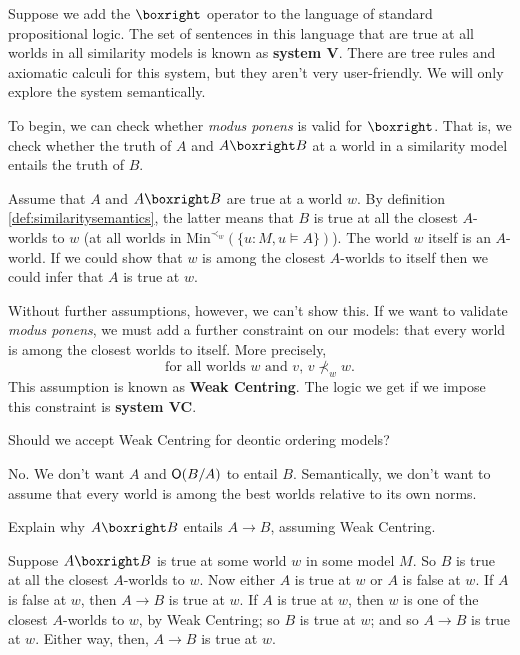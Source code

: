 Suppose we add the $\boxright$ operator to the language of standard
propositional logic. The set of sentences in this language that are true at all
worlds in all similarity models is known as \textbf{system V}. There are tree
rules and axiomatic calculi for this system, but they aren't very user-friendly.
We will only explore the system semantically.

To begin, we can check whether \emph{modus ponens} is valid for $\boxright$. That is,
we check whether the truth of $A$ and $A \boxright B$ at a world in a
similarity model entails the truth of $B$.

Assume that $A$ and $A \boxright B$ are true at a world $w$. By definition
\ref{def:similaritysemantics}, the latter means that $B$ is true at all the
closest $A$-worlds to $w$ (at all worlds in
$\mathrm{Min}^{\prec_w}(\{u: M,u\models A\})$). The world $w$ itself is an
$A$-world. If we could show that $w$ is among the closest $A$-worlds to itself
then we could infer that $A$ is true at $w$.

Without further assumptions, however, we can't show this. If we want to validate
\emph{modus ponens}, we must add a further constraint on our models: that every
world is among the closest worlds to itself. More precisely,
\[
  \text{for all worlds $w$ and $v$, $v \nprec_{w} w$.}
\]
This assumption is known as \textbf{Weak Centring}.
The logic we get if we impose this constraint is \textbf{system VC}.

\begin{exercise}
  Should we accept Weak Centring for deontic ordering models?
\end{exercise}
\begin{solution}
  No. We don't want $A$ and $\operatorname{\mathsf{O}}(B/A)$ to entail $B$. Semantically, we don't
  want to assume that every world is among the best worlds relative to its own
  norms.
\end{solution}

\begin{exercise}
  Explain why $A \boxright B$ entails $A \to B$, assuming Weak Centring.
\end{exercise}
\begin{solution}
  Suppose $A \boxright B$ is true at some world $w$ in some model $M$. So $B$ is
  true at all the closest $A$-worlds to $w$. Now either $A$ is true at $w$ or
  $A$ is false at $w$. If $A$ is false at $w$, then $A\to B$ is true at $w$. If
  $A$ is true at $w$, then $w$ is one of the closest $A$-worlds to $w$, by Weak
  Centring; so $B$ is true at $w$; and so $A\to B$ is true at $w$. Either way,
  then, $A\to B$ is true at $w$.
 \end{solution}

